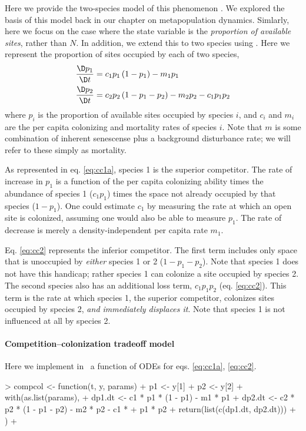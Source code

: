 Here we provide the two-species model of this phenomenon \cite{Hastings:1980kx}. 
We explored the basis of this model back in our chapter on metapopulation dynamics. Simlarly, here we focus on the case where the state variable is the \emph{proportion of available sites}, rather than $N$. In addition, we extend this to two species using \cite{Hastings:1980kx}. Here we represent the proportion of sites occupied by each of two species,
\begin{align}
  \frac{\D p_1}{\D t} &= c_1p_1\left(1-p_1\right) - m_1p_1   \label{eq:cc1a}\\
  \frac{\D p_2}{\D t} &= c_2p_2\left(1-p_1-p_2\right) - m_2p_2 - c_1p_1p_2   \label{eq:cc2}
\end{align}
where $p_i$ is the proportion of available sites occupied by species $i$, and $c_i$ and $m_i$ are the per capita colonizing and mortality rates of species $i$. Note that $m$ is some combination of inherent senescense plus a background disturbance rate; we will refer to these simply as mortality.

As represented in eq. \ref{eq:cc1a}, species 1 is the superior competitor. The rate of increase in $p_1$ is a function of the per capita colonizing ability times the abundance of species 1 ($c_1p_1$) times the space not already occupied by that species ($1-p_1$). One could estimate $c_1$ by measuring the rate at which an open site is colonized, assuming one would also be able to measure $p_1$. The rate of decrease is merely a density-independent per capita rate $m_1$. 

Eq. \ref{eq:cc2} represents the inferior competitor. The first term includes only space that is unoccupied by \emph{either} species 1 or 2 ($1-p_1-p_2$). Note that species 1 does not have this handicap; rather species 1 can colonize a site occupied by species 2. The second species also has an additional loss term, $c_1p_1p_2$ (eq. \ref{eq:cc2}). This term is the rate at which species 1, the superior competitor, colonizes sites occupied by species 2, \emph{and immediately displaces it}. Note that species 1 is not influenced at all by species 2.

\medskip \noindent
\begin{boxedminipage}{\linewidth}
  {\footnotesize
\paragraph{Competition--colonization tradeoff model} 
Here we implement in \R~a function of ODEs for eqs. \ref{eq:cc1a}, \ref{eq:cc2}.
\begin{Schunk}
\begin{Sinput}
> compcol <- function(t, y, params) {
+     p1 <- y[1]
+     p2 <- y[2]
+     with(as.list(params), {
+         dp1.dt <- c1 * p1 * (1 - p1) - m1 * p1
+         dp2.dt <- c2 * p2 * (1 - p1 - p2) - m2 * p2 - c1 * 
+             p1 * p2
+         return(list(c(dp1.dt, dp2.dt)))
+     })
+ }
\end{Sinput}
\end{Schunk}
}
\end{boxedminipage} \medskip

